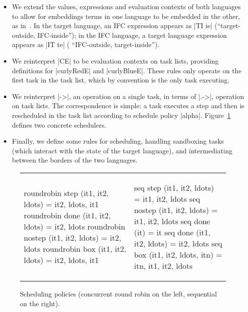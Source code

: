 \begin{itemize}
    \item We extend the values, expressions and evaluation contexts of
      both languages to allow for embeddings terms in one language to
      be embedded in the other, as
      in~\cite{Matthews:2007:OSM:1190216.1190220}.
In the target language, an IFC expression appears as |TI ie| (``target-outside,
IFC-inside''); in the IFC language, a target language expression appears as |IT
te| ( ``IFC-outside, target-inside'').
    \item We reinterpret |CE| to be evaluation contexts on task lists, providing definitions for |curlyRedE| and |curlyBlueE|.  These rules only operate on the first task in the task list, which by convention is the only task executing.
    \item We reinterpret |->|, an operation on a single task, in terms of |.->|, operation on task lists.  The correspondence is simple: a task executes a step and then is rescheduled in the task list according to schedule policy |alpha|.
    Figure~\ref{fig:scheduler} defines two concrete schedulers.
    \item Finally, we define some rules for scheduling, handling sandboxing tasks (which interact with the state of the target language),
    and intermediating between the borders of the two languages.
\end{itemize}

\begin{figure}[t]
\begin{tabular}{ll}
\begin{minipage}{.45\textwidth}
\begin{code}
  roundrobin step (it1, it2, ldots)    = it2, ldots, it1
  roundrobin done (it1, it2, ldots)    = it2, ldots
  roundrobin nostep (it1, it2, ldots)  = it2, ldots
  roundrobin box (it1, it2, ldots)     = it2, ldots, it1
\end{code}
\end{minipage} &
\begin{minipage}{.45\textwidth}
\begin{code}
  seq step (it1, it2, ldots)      = it1, it2, ldots
  seq nostep (it1, it2, ldots)    = it1, it2, ldots
  seq done (it)                   = it
  seq done (it1, it2, ldots)      = it2, ldots
  seq box (it1, it2, ldots, itn)  = itn, it1, it2, ldots
\end{code}
\end{minipage}
\end{tabular}
\vspace*{-0.5cm}
\caption{Scheduling policies (concurrent round robin on the left, sequential on the right).}
\label{fig:scheduler}
\end{figure}

